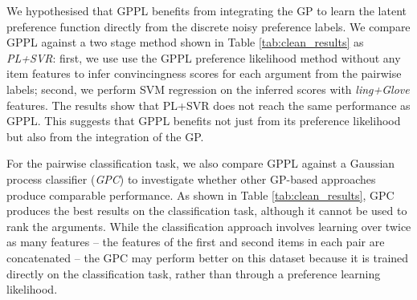 We hypothesised that GPPL benefits from integrating the GP to learn the latent preference function
directly from the discrete noisy preference labels. 
We compare GPPL against a two stage method shown in Table \ref{tab:clean_results} as \emph{PL+SVR}: 
first, we use use the GPPL preference likelihood method without any item features to infer convincingness scores for each argument from the pairwise labels; 
second, we perform SVM regression on the inferred scores with \emph{ling+Glove} features.
The results show that PL+SVR does not reach the same performance as GPPL. 
This suggests that GPPL benefits not just from its preference likelihood but also from
the integration of the GP.

For the pairwise classification task, we also compare GPPL against a Gaussian process classifier (\emph{GPC}) to investigate whether other GP-based approaches produce comparable performance. As shown in Table \ref{tab:clean_results}, GPC produces the best results on the classification task, although it cannot be used
to rank the arguments.
While the classification approach involves learning over twice as many features -- the features of the first and second items in each pair are concatenated -- the GPC may perform better on this dataset 
because it is trained directly on the classification task, rather than through a preference learning likelihood. 
